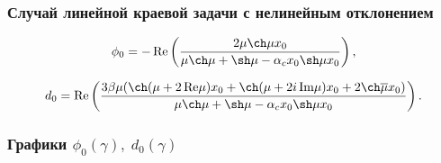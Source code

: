 \documentclass[fullscreen=true, unicode, bookmarks=false]{beamer}
\begin{document}
\begin{frame}
\frametitle {Случай линейной краевой задачи с нелинейным отклонением }

$$ \phi_0 = - \operatorname{Re} \left( \frac{2 \mu \ch \mu x_0}{\mu \ch \mu + \sh \mu - \alpha_c x_0 \sh \mu x_0} \right), $$

$$ d_0 = \operatorname{Re} \left( \frac{3 \beta \mu (\ch (\mu + 2\,\mbox{Re}\mu) x_0 + \ch (\mu + 2i\,\mbox{Im}\mu) x_0 + 2 \ch \overline{\mu} x_0)}{\mu \ch \mu + \sh \mu - \alpha_c x_0 \sh \mu x_0} \right). $$

\end{frame}

\begin{frame}
\frametitle { Графики $ \phi_0(\gamma), \; d_0(\gamma) $ }

\begin{figure}[h]
\hspace{-4cm}
\begin{minipage}[h]{0.2\linewidth}
\end{minipage}
\hspace{3.5cm}
\begin{minipage}[h]{0.2\linewidth}

\end{minipage}
\end{figure}
\end{frame}
\end{document}

